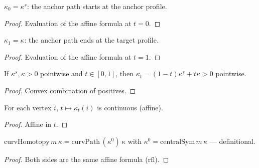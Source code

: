 
\begin{lemma}\leanok
[path endpoint $t=0$]
  \label{lem:curv_path_zero}
  $\kappa_0 = \kappa^s$: the anchor path starts at the anchor profile.
\end{lemma}
\begin{proof}

\leanok
  Evaluation of the affine formula at $t = 0$.
\end{proof}

\begin{lemma}\leanok
[path endpoint $t=1$]
  \label{lem:curv_path_one}
  $\kappa_1 = \kappa$: the anchor path ends at the target profile.
\end{lemma}
\begin{proof}

\leanok
  Evaluation of the affine formula at $t = 1$.
\end{proof}

\begin{lemma}
  \label{lem:curv_path_pos}
  If $\kappa^s, \kappa > 0$ pointwise and $t \in [0,1]$, then
  $\kappa_t = (1-t)\kappa^s + t\kappa > 0$ pointwise.
\end{lemma}
\begin{proof}

\leanok
  Convex combination of positives.
\end{proof}

\begin{lemma}\leanok
[continuity in $t$]
  \label{lem:continuous_curv_path}
  For each vertex $i$, $t \mapsto \kappa_t(i)$ is continuous (affine).
\end{lemma}
\begin{proof}

\leanok
  Affine in $t$.
\end{proof}

\begin{lemma}
  \label{lem:curv_homotopy_eq_curv_path}
  $\mathrm{curvHomotopy}\,m\,\kappa = \mathrm{curvPath}\,(\kappa^0)\,\kappa$
  with $\kappa^0 = \mathrm{centralSym}\,m\,\kappa$ — definitional.
\end{lemma}
\begin{proof}

\leanok
  Both sides are the same affine formula ($\mathrm{rfl}$).
\end{proof}

